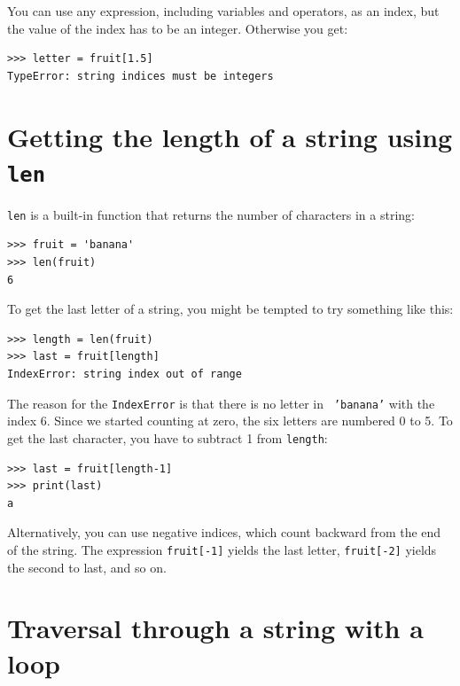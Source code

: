 
You can use any expression, including variables and operators, as an
index, but the value of the index has to be an integer.  Otherwise you
get:


\beforeverb
\begin{verbatim}
>>> letter = fruit[1.5]
TypeError: string indices must be integers
\end{verbatim}
\afterverb
%

\section{Getting the length of a string using {\tt len}}


{\tt len} is a built-in function that returns the number of characters
in a string:

\beforeverb
\begin{verbatim}
>>> fruit = 'banana'
>>> len(fruit)
6
\end{verbatim}
\afterverb
%
To get the last letter of a string, you might be tempted to try something
like this:


\beforeverb
\begin{verbatim}
>>> length = len(fruit)
>>> last = fruit[length]
IndexError: string index out of range
\end{verbatim}
\afterverb
%
The reason for the {\tt IndexError} is that there is no letter in {\tt
'banana'} with the index 6.  Since we started counting at zero, the
six letters are numbered 0 to 5.  To get the last character, you have
to subtract 1 from {\tt length}:

\beforeverb
\begin{verbatim}
>>> last = fruit[length-1]
>>> print(last)
a
\end{verbatim}
\afterverb
%
Alternatively, you can use negative indices, which count backward from
the end of the string.  The expression {\tt fruit[-1]} yields the last
letter, {\tt fruit[-2]} yields the second to last, and so on.



\section{Traversal through a string with a loop}
\label{for}

